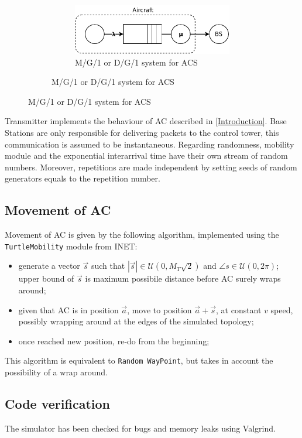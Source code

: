 \documentclass[a4paper,12pt]{article}
\begin{document}
\begin{figure}[H]
\begin{subfigure}[b]{.45\textwidth}
    \begin{subfigure}[b]{\textwidth}
      \centering
      \includegraphics[width=\textwidth]{img/model.pdf}
      \caption{M/G/1 or D/G/1 system for ACS}
      \label{fig:model}
    \end{subfigure}
  \end{subfigure}
\end{figure}
Transmitter implements the behaviour of AC described in \ref{Introduction}. Base Stations are only responsible for delivering packets to the control tower,
this communication is assumed to be instantaneous.
Regarding randomness, mobility module and the exponential interarrival time have their own stream of random numbers.
Moreover, repetitions are made independent by setting seeds of random generators equals to the repetition number.

\subsection{Movement of AC}
Movement of AC is given by the following algorithm, implemented using the \texttt{TurtleMobility} module from INET:
\begin{itemize}
  \item generate a vector $\vec{s}$ such that $|\vec{s}| \in \mathcal{U}(0, M_{T}\sqrt{2})$ and $\angle{s} \in \mathcal{U}(0, 2\pi)$; upper bound of $\vec{s}$ is maximum possibile distance before AC surely wraps around;
  \item given that AC is in position $\vec{a}$, move to position $\vec{a} + \vec{s}$, at constant $v$ speed, possibly wrapping around at the edges of the simulated topology;
  \item once reached new position, re-do from the beginning;
\end{itemize}

This algorithm is equivalent to \texttt{Random WayPoint}, but takes in account the possibility of a wrap around.

\subsection{Code verification}
The simulator has been checked for bugs and memory leaks using Valgrind.
\end{document}

